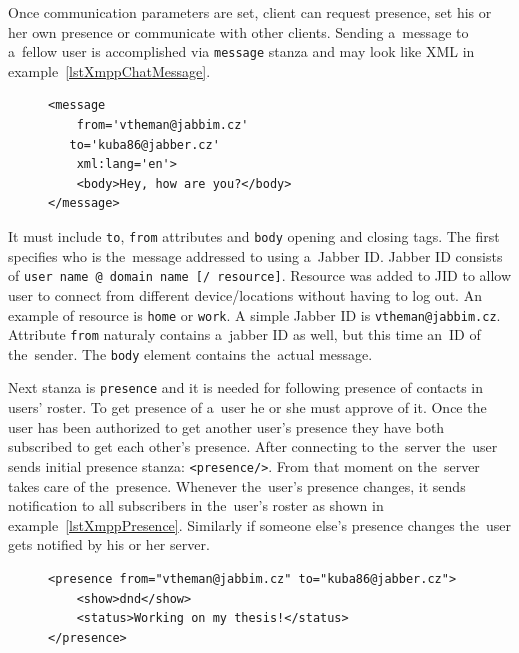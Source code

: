 Once communication parameters are set, client can request presence, set his or her own presence or communicate with other clients. Sending a~message to a~fellow user is accomplished via \verb|message| stanza and may look like XML in example~\ref{lstXmppChatMessage}.

\begin{figure}[h]
\begin{lstlisting}
<message 
	from='vtheman@jabbim.cz'
   to='kuba86@jabber.cz'
	xml:lang='en'>
	<body>Hey, how are you?</body>
</message>
\end{lstlisting}
\end{figure}

It must include \verb|to|, \verb|from| attributes and \verb|body| opening and closing tags. The first specifies who is the~message addressed to using a~Jabber ID. Jabber ID consists of \newline\verb|user name @ domain name [/ resource]|. Resource was added to JID to allow user to connect from different device/locations without having to log out. An example of resource is \verb|home| or \verb|work|. A simple Jabber ID is \verb|vtheman@jabbim.cz|. Attribute \verb|from| naturaly contains a~jabber ID as well, but this time an~ID of the~sender. The \verb|body| element contains the~actual message. 

Next stanza is \verb|presence| and it is needed for following presence of contacts in users' roster. To get presence of a~user he or she must approve of it. Once the user has been authorized to get another user's presence they have both subscribed to get each other's presence. After connecting to the~server the~user sends initial presence stanza: \verb|<presence/>|. From that moment on the~server takes care of the~presence. Whenever the~user's presence changes, it sends notification to all subscribers in the~user's roster as shown in example~\ref{lstXmppPresence}. Similarly if someone else's presence changes the~user gets notified by his or her server.  

\begin{figure}[h]
\begin{lstlisting}
<presence from="vtheman@jabbim.cz" to="kuba86@jabber.cz">
	<show>dnd</show>
	<status>Working on my thesis!</status>
</presence>
\end{lstlisting}
\end{figure}

